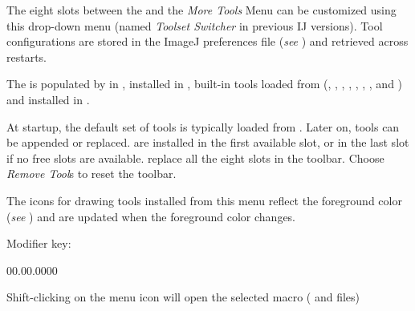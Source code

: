 The eight  slots between the 
and the \emph{More Tools} Menu
can be customized using this drop-down menu (named \emph{Toolset Switcher}
in previous IJ versions). Tool configurations are stored in the ImageJ
preferences file (\emph{see} )
and retrieved across restarts. 

The  is populated by 
in ,  installed
in , built-in tools loaded from
 (, ,
, , ,
, , 
and ) and 
installed in .

At startup, the default set of tools is typically loaded from .
Later on, tools can be appended or replaced. 
are installed in the first available slot, or in the last slot if
no free slots are available. 
replace all the eight slots in the toolbar. Choose \emph{Remove Tool}s
to reset the toolbar. 

The icons for drawing tools installed from this menu reflect the foreground
color (\emph{see} ) and are updated
when the foreground color changes. 

Modifier key:
\begin{lyxlist}{00.00.0000}
\item [{\mykeystroke{Shift}}] \noindent Shift-clicking on the menu icon
will open the selected macro ( and 
files)
\end{lyxlist}



